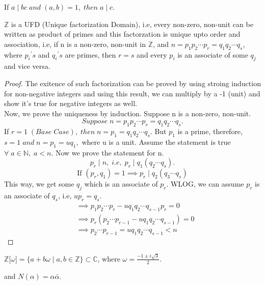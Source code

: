 \documentclass[10pt,a4paper]{article}
\begin{document}
\begin{corollary}
If $a\mid bc\;and\;(a,b) = 1,\;then\;a\mid c$.
\end{corollary}

\begin{theorem}
$\mathbb{Z}$ is a UFD (Unique factorization Domain), i.e, every non-zero, non-unit can be written as product of primes and this factorzation is unique upto order and association, i.e, if n is a non-zero, non-unit in $\mathbb{Z}$, and $n = p_{1}p_{2}{\cdots}p_{r} = q_{1}q_{2}{\cdots}q_{s}$, where ${p_{i}}^{\prime}s$ and ${q_{i}}^{\prime}s$ are primes, then $r=s$ and every $p_{i}$ is an associate of some $q_{j}$ and vice versa.
\end{theorem}

\begin{proof}
The exitence of such factorization can be proved by using stroing induction for non-negative integers and using this result, we can multiply by a -1 (unit) and show it's true for negative integers as well. \\
Now, we prove the uniqueness by induction. Suppose n is a non-zero, non-unit.$$Suppose\;n = p_{1}p_{2}{\cdots}p_{r} = q_{1}q_{2}{\cdots}q_{s}.$$
If $r = 1\;(Base\;Case),\;then\; n = p_{1} = q_{1}q_{2}{\cdots}q_{s}$. But $p_{1}$ is a prime, therefore, $s=1\;and\;n=p_{1}=uq_{1},$ where u is a unit. Assume the statement is true $\forall\;a\in\mathbb{N},\;a<n$. Now we prove the statement for n. $$p_{r}\mid n,\;i.e,\; p_{r}\mid q_{1}(q_{2}{\cdots}q_{s}).$$
$$\text{If }(p_{r},q_{1})=1\implies p_{r}\mid q_{2}(q_{3}{\cdots}q_{s})$$
This way, we get some $q_{j}$ which is an associate of $p_{r}$. WLOG, we can assume $p_{r}$ is an associate of $q_{s}$, i.e, $up_{r} = q_{s}.$
\begin{align*}
&\implies p_{1}p_{2}{\cdots}p_{r} - uq_{1}q_{2}{\cdots}q_{s-1}p_{r}=0 \\
&\implies p_r(p_{2}{\cdots}p_{r-1} - uq_{1}q_{2}{\cdots}q_{s-1}) = 0 \\
&\implies p_{2}{\cdots}p_{r-1} = uq_{1}q_{2}{\cdots}q_{s-1} < n
\end{align*}
\end{proof}

\begin{mydef}
$\mathbb{Z}\lbrack\omega\rbrack = \{a+b\omega\mid a,b\in \mathbb{Z}\} \subset \mathbb{C}$, where $\omega  = \frac{-1\pm i\sqrt{3}}{2}$.
\begin{center}
and $N(\alpha) = {\alpha}\bar{\alpha}.$ \\
\end{center}
\end{mydef}
\end{document}

